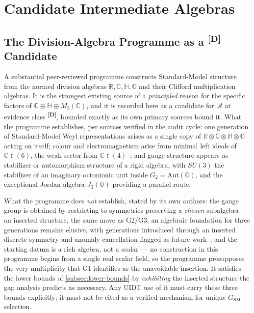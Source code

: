 \documentclass[12pt,a4paper,twoside]{article}
\theoremstyle{plain}
\theoremstyle{definition}
\theoremstyle{remark}
\newcommand{\catmark}[1]{\textsuperscript{\textsf{\textbf{[#1]}}}}
\begin{document}
\section{Candidate Intermediate Algebras}
\label{sec:candidates}

\subsection{The Division-Algebra Programme as a \catmark{D} Candidate}
\label{subsec:division-algebra}

A substantial peer-reviewed programme constructs Standard-Model structure
from the normed division algebras $\mathbb R, \mathbb C, \mathbb H,
\mathbb O$ and their Clifford multiplication algebras. It is the
strongest existing source of a \emph{principled} reason for the specific
factors of $\mathbb C \oplus \mathbb H \oplus M_3(\mathbb C)$, and it is
recorded here as a candidate for $\mathcal A$ at evidence class
\catmark{D}, bounded exactly as its own primary sources bound it. What
the programme establishes, per sources verified in the audit cycle: one
generation of Standard-Model Weyl representations arises as a single copy
of $\mathbb R \otimes \mathbb C \otimes \mathbb H \otimes \mathbb O$
acting on itself; colour and electromagnetism arise from minimal left
ideals of $\mathbb C\ell(6)$, the weak sector from $\mathbb C\ell(4)$~\cite{furey2018};
and gauge structure appears as stabilizer or automorphism structure of a
rigid algebra, with $SU(3)$ the stabilizer of an imaginary octonionic
unit inside $G_2 = \mathrm{Aut}(\mathbb O)$, and the exceptional Jordan
algebra $J_3(\mathbb O)$ providing a parallel route.

What the programme does \emph{not} establish, stated by its own authors:
the gauge group is obtained by restricting to symmetries preserving a
\emph{chosen} subalgebra --- an inserted structure, the same move as
G2/G3; an algebraic foundation for three generations remains elusive,
with generations introduced through an inserted discrete symmetry and
anomaly cancellation flagged as future work~\cite{gourlay2024,furey2025}; and the starting datum is a
rich algebra, not a scalar --- no construction in this programme begins
from a single real scalar field, so the programme presupposes the very
multiplicity that G1 identifies as the unavoidable insertion. It
satisfies the lower bounds of \cref{subsec:lower-bounds} by
\emph{exhibiting} the inserted structure the gap analysis predicts as
necessary. Any UIDT use of it must carry these three bounds explicitly;
it must not be cited as a verified mechanism for unique
$G_{\mathrm{SM}}$ selection.
\end{document}
